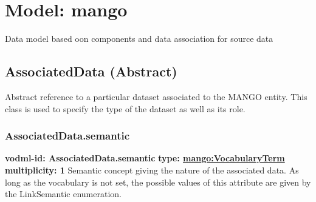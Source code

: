 
%



    
    
    
    
    
    
      

\pagebreak
\section{Model: mango }
  

  Data model based oon components and data association for source data

  \subsection{AssociatedData (Abstract)}
  \label{sect:AssociatedData}
    Abstract reference to a particular dataset associated to the MANGO entity. This class is used to specify the type of the dataset as well as its role.

    \subsubsection{AssociatedData.semantic}
      \textbf{vodml-id: AssociatedData.semantic} \newline
      \textbf{type: \hyperref[sect:VocabularyTerm]{mango:VocabularyTerm}} \newline
      \textbf{multiplicity: 1} \newline 
      Semantic concept giving the nature of the associated data. As long as the vocabulary is not set, the possible values of this attribute are given by the LinkSemantic enumeration.

